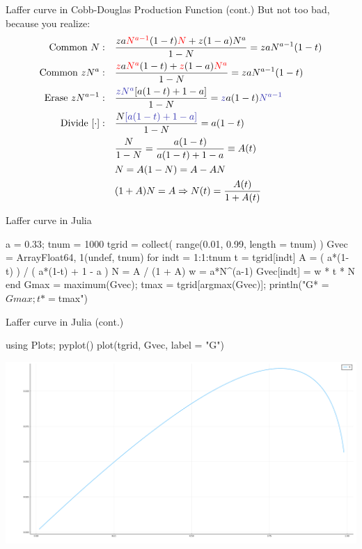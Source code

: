 \documentclass[11pt,aspectratio=43,usenames,dvipsnames]{beamer}
\newcommand{\red}[1]{\textcolor{red}{#1}}
\newcommand{\blue}[1]{\textcolor{blue}{#1}}
\theoremstyle{definition}
\begin{document}
\begin{frame}{Laffer curve in Cobb-Douglas Production Function (cont.)}
\label{slide:Laffer_curve_in_Cobb_Douglas_Production_Function__cont__}
    But not too bad, because you realize:
    \begin{align}
        \text{Common } N: \quad
            & \frac{z a \red{N^{a-1}}(1-t)\red{N} + z (1-a) N^{a}}{ 1-N} = z a N^{a-1} (1-t)
        \\
        \text{Common } z N^{a}: \quad
            & \frac{\red{z} a \red{N^{a}}(1-t) + \red{z} (1-a) \red{N^{a}}}{ 1-N} = z a N^{a-1} (1-t)
        \\
        \text{Erase } z N^{a-1}: \quad
            & \frac{\blue{z N^{a}} [a (1-t) + 1-a]}{1-N} = \blue{z} a (1-t) \blue{N^{a-1}}
        \\
        \text{Divide } [\cdot]: \quad
            & \frac{N \blue{[a (1-t) + 1-a]}}{1-N} = a (1-t)
        \\
            & \frac{N}{1-N} = \frac{a(1-t)}{a(1-t) + 1-a} \equiv A(t)
        \\
            & N = A(1-N) = A - AN
        \\
            & (1+A)N = A \Rightarrow N(t) = \frac{A(t)}{1+A(t)}
    \end{align}
\end{frame}

\begin{frame}[fragile]{Laffer curve in Julia}
\label{slide:Laffer_curve_in_Julia}
\begin{juliacode}
    a = 0.33; tnum = 1000
    tgrid = collect( range(0.01, 0.99, length = tnum) )
    Gvec = Array{Float64, 1}(undef, tnum)
    for indt = 1:1:tnum
        t = tgrid[indt]
        A = ( a*(1-t) ) / ( a*(1-t) + 1 - a )
        N = A / (1 + A)
        w = a*N^(a-1)
        Gvec[indt] = w * t * N
    end
    Gmax = maximum(Gvec); tmax = tgrid[argmax(Gvec)];
    println("G* = $Gmax; t* = $tmax")
\end{juliacode}
\end{frame}

\begin{frame}[fragile]{Laffer curve in Julia (cont.)}
\label{slide:Laffer_curve_in_Julia__cont__}
\begin{juliacode}
    using Plots; pyplot()
    plot(tgrid, Gvec, label = "G")
\end{juliacode}
\includegraphics[width=\textwidth]{./figures/lafferCurve.png}
\end{frame}
\end{document}
